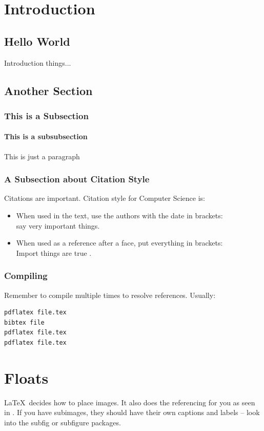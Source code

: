 \documentclass[a4paper,twoside,12pt]{report}
\begin{document}
\chapter{Introduction}
\section{Hello World}
Introduction things...\\
\section{Another Section}
\subsection{This is a Subsection}
\subsubsection{This is a subsubsection}
This is just a paragraph
\subsection{A Subsection about Citation Style}
Citations are important. Citation style for Computer Science is:
\begin{itemize}
\item When used in the text, use the authors with the date in brackets:\\ \citet{klein17} say very important things.
\item When used as a reference after a face, put everything in brackets:\\ Import things are true \citep{klein17}.
\end{itemize}

\subsection{Compiling}
Remember to compile multiple times to resolve references. Usually:
\begin{verbatim}
pdflatex file.tex
bibtex file
pdflatex file.tex
pdflatex file.tex
\end{verbatim}


\chapter{Floats}
\LaTeX\ decides how to place images. It also does the referencing for you as seen in . If you have subimages, they should have their own captions and labels -- look into the subfig or subfigure packages.
\end{document}
